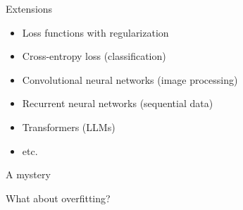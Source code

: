 \begin{frame}{Extensions}


    \begin{itemize}
        \item Loss functions with regularization
        \vspace{0.5em}
        \item Cross-entropy loss (classification)
        \vspace{0.5em}
        \item Convolutional neural networks (image processing)
        \vspace{0.5em}
        \item Recurrent neural networks (sequential data)
        \vspace{0.5em}
        \item Transformers (LLMs)
        \vspace{0.5em}
        \item etc.
    \end{itemize}
    
\end{frame}



\begin{frame}{A mystery}
    
    What about overfitting?

\end{frame}

\begin{frame}
    
    \begin{figure}
       \centering
    \end{figure}

\end{frame}

